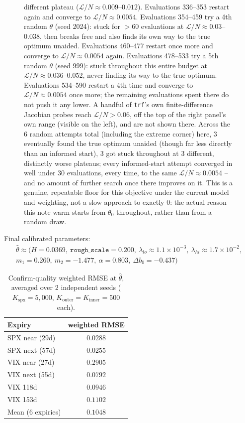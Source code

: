 \documentclass[11pt]{article}
\begin{document}
\begin{figure}[h]
{different plateau ($\mathcal L/N\approx0.009$--$0.012$). Evaluations
336--353 restart again and converge to $\mathcal L/N\approx0.0054$.
Evaluations 354--459 try a 4th random $\theta$ (seed 2024): stuck for
$>60$ evaluations at $\mathcal L/N\approx0.03$--$0.038$, then breaks
free and also finds its own way to the true optimum unaided.
Evaluations 460--477 restart once more and converge to
$\mathcal L/N\approx0.0054$ again. Evaluations 478--533 try a 5th
random $\theta$ (seed 999): stuck throughout this entire budget at
$\mathcal L/N\approx0.036$--$0.052$, never finding its way to the true
optimum. Evaluations 534--590 restart a 4th time and converge to
$\mathcal L/N\approx0.0054$ once more; the remaining evaluations spent
there do not push it any lower. A handful of \texttt{trf}'s own
finite-difference Jacobian probes reach $\mathcal L/N>0.06$, off the
top of the right panel's own range (visible on the left), and are not
shown there. Across the 6 random attempts total (including the
extreme corner) here, 3 eventually found the true optimum unaided
(though far less directly than an informed start), 3 got stuck
throughout at 3 different, distinctly worse plateaus; every
informed-start attempt converged in well under 30 evaluations, every
time, to the same $\mathcal L/N\approx0.0054$ -- and no amount of
further search once there improves on it. This is a genuine,
repeatable floor for this objective under the current model and
weighting, not a slow approach to exactly $0$: the actual reason this
note warm-starts from $\theta_0$ throughout, rather than from a random
draw.}
\label{fig:convergence}
\end{figure}

Final calibrated parameters:
\begin{gather*}
\hat\theta\approx\big(H{=}0.0369,\ \texttt{rough\_scale}{=}0.200,\
\lambda_{lo}{\approx}1.1{\times}10^{-3},\ \lambda_{hi}{\approx}1.7{\times}10^{-2},\\
m_1{=}0.260,\ m_2{=}-1.477,\ \alpha{=}0.803,\ \Delta b_0{=}-0.437\big)
\end{gather*}

\begin{table}[h]
\centering
\caption{Confirm-quality weighted RMSE at $\hat\theta$, averaged over
2 independent seeds ($K_{\text{spx}}=5{,}000$,
$K_{\text{outer}}=K_{\text{inner}}=500$ each).}
\label{tab:calibresult}
\begin{tabular}{lc}
\toprule
Expiry & weighted RMSE \\
\midrule
SPX near (29d) & $0.0288$ \\
SPX next (57d) & $0.0255$ \\
VIX near (27d) & $0.2905$ \\
VIX next (55d) & $0.0792$ \\
VIX 118d & $0.0946$ \\
VIX 153d & $0.1102$ \\
\midrule
Mean (6 expiries) & $0.1048$ \\
\bottomrule
\end{tabular}
\end{table}
\end{document}
